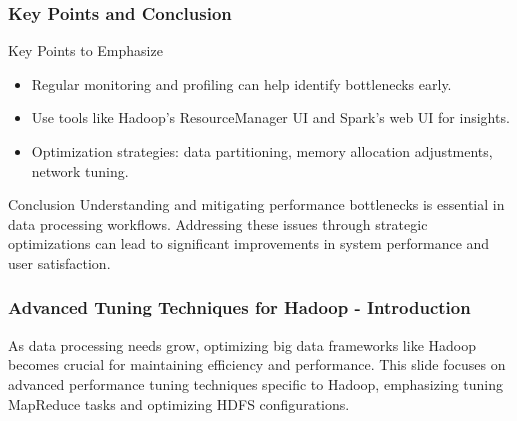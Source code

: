 \documentclass[aspectratio=169]{beamer}
\begin{document}
\begin{frame}[fragile]
    \frametitle{Key Points and Conclusion}
    \begin{block}{Key Points to Emphasize}
        \begin{itemize}
            \item Regular monitoring and profiling can help identify bottlenecks early.
            \item Use tools like Hadoop's ResourceManager UI and Spark's web UI for insights.
            \item Optimization strategies: data partitioning, memory allocation adjustments, network tuning.
        \end{itemize}
    \end{block}

    \begin{block}{Conclusion}
        Understanding and mitigating performance bottlenecks is essential in data processing workflows. Addressing these issues through strategic optimizations can lead to significant improvements in system performance and user satisfaction.
    \end{block}
\end{frame}

\begin{frame}[fragile]
    \frametitle{Advanced Tuning Techniques for Hadoop - Introduction}
    As data processing needs grow, optimizing big data frameworks like Hadoop becomes crucial for maintaining efficiency and performance. This slide focuses on advanced performance tuning techniques specific to Hadoop, emphasizing tuning MapReduce tasks and optimizing HDFS configurations.
\end{frame}
\end{document}
